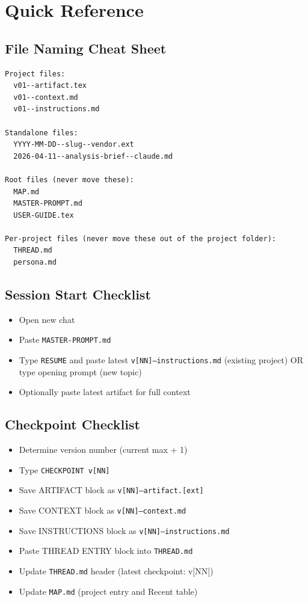 \documentclass[12pt,letterpaper]{article}
\begin{document}
\section{Quick Reference}

\subsection{File Naming Cheat Sheet}

\begin{lstlisting}
Project files:
  v01--artifact.tex
  v01--context.md
  v01--instructions.md

Standalone files:
  YYYY-MM-DD--slug--vendor.ext
  2026-04-11--analysis-brief--claude.md

Root files (never move these):
  MAP.md
  MASTER-PROMPT.md
  USER-GUIDE.tex

Per-project files (never move these out of the project folder):
  THREAD.md
  persona.md
\end{lstlisting}

\subsection{Session Start Checklist}

\begin{itemize}
  \item[$\square$] Open new chat
  \item[$\square$] Paste \texttt{MASTER-PROMPT.md}
  \item[$\square$] Type \texttt{RESUME} and paste latest \texttt{v[NN]--instructions.md}
        (existing project) OR type opening prompt (new topic)
  \item[$\square$] Optionally paste latest artifact for full context
\end{itemize}

\subsection{Checkpoint Checklist}

\begin{itemize}
  \item[$\square$] Determine version number (current max + 1)
  \item[$\square$] Type \texttt{CHECKPOINT v[NN]}
  \item[$\square$] Save ARTIFACT block as \texttt{v[NN]--artifact.[ext]}
  \item[$\square$] Save CONTEXT block as \texttt{v[NN]--context.md}
  \item[$\square$] Save INSTRUCTIONS block as \texttt{v[NN]--instructions.md}
  \item[$\square$] Paste THREAD ENTRY block into \texttt{THREAD.md}
  \item[$\square$] Update \texttt{THREAD.md} header (latest checkpoint: v[NN])
  \item[$\square$] Update \texttt{MAP.md} (project entry and Recent table)
\end{itemize}
\end{document}
